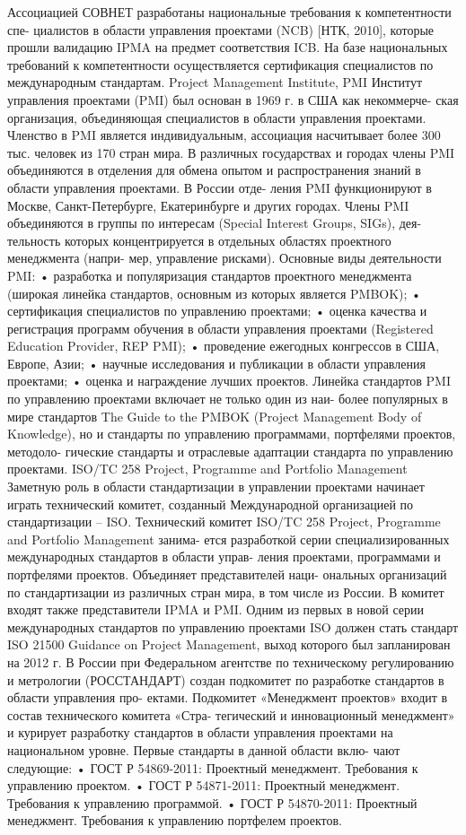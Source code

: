 Ассоциацией СОВНЕТ разработаны национальные требования к компетентности спе-
циалистов в области управления проектами (NCB) [НТК, 2010], которые прошли валидацию
IPMA на предмет соответствия ICB. На базе национальных требований к компетентности
осуществляется сертификация специалистов по международным стандартам.
Project Management Institute, PMI
Институт управления проектами (PMI) был основан в 1969 г. в США как некоммерче-
ская организация, объединяющая специалистов в области управления проектами. Членство
в PMI является индивидуальным, ассоциация насчитывает более 300 тыс. человек из 170
стран мира. В различных государствах и городах члены PMI объединяются в отделения для
обмена опытом и распространения знаний в области управления проектами. В России отде-
ления PMI функционируют в Москве, Санкт-Петербурге, Екатеринбурге и других городах.
Члены PMI объединяются в группы по интересам (Special Interest Groups, SIGs), дея-
тельность которых концентрируется в отдельных областях проектного менеджмента (напри-
мер, управление рисками).
Основные виды деятельности PMI:
• разработка и популяризация стандартов проектного менеджмента (широкая линейка
стандартов, основным из которых является PMBOK);
• сертификация специалистов по управлению проектами;
• оценка качества и регистрация программ обучения в области управления проектами
(Registered Education Provider, REP PMI);
• проведение ежегодных конгрессов в США, Европе, Азии;
• научные исследования и публикации в области управления проектами;
• оценка и награждение лучших проектов.
Линейка стандартов PMI по управлению проектами включает не только один из наи-
более популярных в мире стандартов The Guide to the PMBOK (Project Management Body of
Knowledge), но и стандарты по управлению программами, портфелями проектов, методоло-
гические стандарты и отраслевые адаптации стандарта по управлению проектами.
ISO/TC 258 Project, Programme and Portfolio Management
Заметную роль в области стандартизации в управлении проектами начинает играть
технический комитет, созданный Международной организацией по стандартизации – ISO.
Технический комитет ISO/TC 258 Project, Programme and Portfolio Management занима-
ется разработкой серии специализированных международных стандартов в области управ-
ления проектами, программами и портфелями проектов. Объединяет представителей наци-
ональных организаций по стандартизации из различных стран мира, в том числе из России.
В комитет входят также представители IPMA и PMI.
Одним из первых в новой серии международных стандартов по управлению проектами
ISO должен стать стандарт ISO 21500 Guidance on Project Management, выход которого был
запланирован на 2012 г.
В России при Федеральном агентстве по техническому регулированию и метрологии
(РОССТАНДАРТ) создан подкомитет по разработке стандартов в области управления про-
ектами. Подкомитет «Менеджмент проектов» входит в состав технического комитета «Стра-
тегический и инновационный менеджмент» и курирует разработку стандартов в области
управления проектами на национальном уровне. Первые стандарты в данной области вклю-
чают следующие:
• ГОСТ Р 54869-2011: Проектный менеджмент. Требования к управлению проектом.
• ГОСТ Р 54871-2011: Проектный менеджмент. Требования к управлению программой.
• ГОСТ Р 54870-2011: Проектный менеджмент. Требования к управлению портфелем
проектов.


